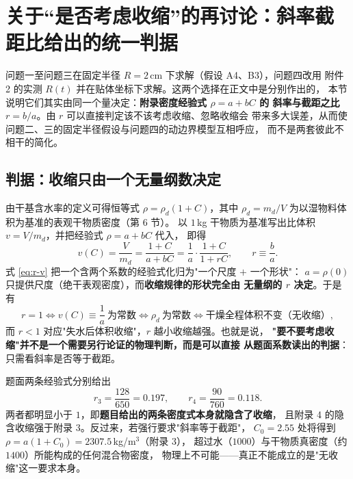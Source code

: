 \documentclass[12pt,a4paper,fontset=none]{ctexart}
\begin{document}
\section{关于``是否考虑收缩''的再讨论：斜率截距比给出的统一判据}

问题一至问题三在固定半径 $R=2$\,cm 下求解（假设 A4、B3），问题四改用
附件 2 的实测 $R(t)$ 并在贴体坐标下求解。这两个选择在正文中是分别作出的，
本节说明它们其实由同一个量决定：\textbf{附录密度经验式 $\rho=a+bC$ 的
斜率与截距之比 $r=b/a$}。由 $r$ 可以直接判定该不该考虑收缩、忽略收缩会
带来多大误差，从而使问题二、三的固定半径假设与问题四的动边界模型互相呼应，
而不是两套彼此不相干的简化。

\subsection{判据：收缩只由一个无量纲数决定}

由干基含水率的定义可得恒等式 $\rho=\rho_d(1+C)$，其中
$\rho_d=m_d/V$ 为以湿物料体积为基准的表观干物质密度（第 6 节）。
以 $1$\,kg 干物质为基准写出比体积 $v=V/m_d$，并把经验式 $\rho=a+bC$ 代入，
即得
\begin{equation}
  v(C)=\frac{V}{m_d}=\frac{1+C}{a+bC}
        =\frac{1}{a}\cdot\frac{1+C}{1+rC},
  \qquad r\equiv\frac{b}{a}.
  \label{eq:r-v}
\end{equation}
式 \eqref{eq:r-v} 把一个含两个系数的经验式化归为"一个尺度 $+$ 一个形状"：
$a=\rho(0)$ 只提供尺度（绝干表观密度），而\textbf{收缩规律的形状完全由
无量纲的 $r$ 决定}。于是有
\begin{equation}
  r=1 \iff v(C)\equiv\frac{1}{a}\ \text{为常数}
       \iff \rho_d\ \text{为常数} \iff \text{干燥全程体积不变（无收缩）},
  \label{eq:r-criterion}
\end{equation}
而 $r<1$ 对应"失水后体积收缩"，$r$ 越小收缩越强。也就是说，
\textbf{"要不要考虑收缩"并不是一个需要另行论证的物理判断，而是可以直接
从题面系数读出的判据}：只需看斜率是否等于截距。

题面两条经验式分别给出
\begin{equation}
  r_3=\frac{128}{650}=0.197,\qquad r_4=\frac{90}{760}=0.118 .
  \label{eq:r-values}
\end{equation}
两者都明显小于 $1$，即\textbf{题目给出的两条密度式本身就隐含了收缩}，
且附录 4 的隐含收缩强于附录 3。反过来，若强行要求"斜率等于截距"，
$C_0=2.55$ 处将得到 $\rho=a(1+C_0)=2307.5$\,kg/m$^3$（附录 3），
超过水（$1000$）与干物质真密度（约 $1400$）所能构成的任何混合物密度，
物理上不可能——真正不能成立的是"无收缩"这一要求本身。
\end{document}
